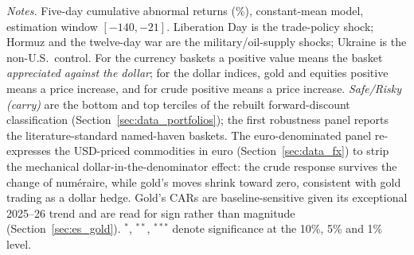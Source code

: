 \begin{table}[htbp]
\begin{threeparttable}
\begin{tabular}{l rrr r}
\bottomrule
\end{tabular}
\begin{tablenotes}[flushleft]\footnotesize
\item \textit{Notes.} Five-day cumulative abnormal returns (\%), constant-mean model,
estimation window $[-140,-21]$. Liberation Day is the trade-policy shock; Hormuz and the
twelve-day war are the military/oil-supply shocks; Ukraine is the non-U.S.\ control. For
the currency baskets a positive value means the basket \emph{appreciated against the
dollar}; for the dollar indices, gold and equities positive means a price increase, and
for crude positive means a price increase. \emph{Safe/Risky (carry)} are the bottom and
top terciles of the rebuilt forward-discount classification (Section~\ref{sec:data_portfolios});
the first robustness panel reports the literature-standard named-haven baskets. The
euro-denominated panel re-expresses the USD-priced commodities in euro
(Section~\ref{sec:data_fx}) to strip the mechanical dollar-in-the-denominator effect:
the crude response survives the change of numéraire, while gold's moves shrink toward
zero, consistent with gold trading as a dollar hedge. Gold's CARs
are baseline-sensitive given its exceptional 2025--26 trend and are read for sign rather
than magnitude (Section~\ref{sec:es_gold}). $^{*}$, $^{**}$, $^{***}$ denote significance
at the 10\%, 5\% and 1\% level.
\end{tablenotes}
\end{threeparttable}
\end{table}
